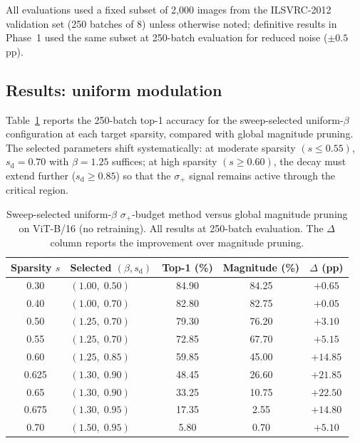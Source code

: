 \documentclass[11pt]{article}
\theoremstyle{plain}
\theoremstyle{definition}
\theoremstyle{remark}
\newcommand{\1}{\mathbf{1}}
\begin{document}
All evaluations used a fixed subset of 2{,}000 images from the ILSVRC-2012 validation set (250 batches of 8) unless otherwise noted; definitive results in Phase~1 used the same subset at 250-batch evaluation for reduced noise (\(\pm 0.5\) pp).

\subsection{Results: uniform modulation}
\label{subsec:uniform_results}

Table~\ref{tab:splus_uniform} reports the 250-batch top-1 accuracy for the sweep-selected uniform-\(\beta\) configuration at each target sparsity, compared with global magnitude pruning.  The selected parameters shift systematically: at moderate sparsity \((s\le 0.55)\), \(s_{\mathrm{d}}=0.70\) with \(\beta=1.25\) suffices; at high sparsity \((s\ge 0.60)\), the decay must extend further (\(s_{\mathrm{d}}\ge 0.85\)) so that the \(\sigma_+\) signal remains active through the critical region.

\begin{table}[ht]
\centering
\caption{Sweep-selected uniform-\(\beta\) \(\sigma_+\)-budget method versus global magnitude pruning on ViT-B/16 (no retraining).  All results at 250-batch evaluation.  The \(\Delta\) column reports the improvement over magnitude pruning.}
\label{tab:splus_uniform}
\begin{tabular}{clccc}
\toprule
Sparsity \(s\) & Selected \((\beta, s_{\mathrm{d}})\) & Top-1 (\%) & Magnitude (\%) & \(\Delta\) (pp) \\
\midrule
0.30 & \((1.00,\;0.50)\) & 84.90 & 84.25 & \(+0.65\) \\
0.40 & \((1.00,\;0.70)\) & 82.80 & 82.75 & \(+0.05\) \\
0.50 & \((1.25,\;0.70)\) & 79.30 & 76.20 & \(+3.10\) \\
0.55 & \((1.25,\;0.70)\) & 72.85 & 67.70 & \(+5.15\) \\
0.60 & \((1.25,\;0.85)\) & 59.85 & 45.00 & \(+14.85\) \\
0.625 & \((1.30,\;0.90)\) & 48.45 & 26.60 & \(+21.85\) \\
0.65 & \((1.30,\;0.90)\) & 33.25 & 10.75 & \(+22.50\) \\
0.675 & \((1.30,\;0.95)\) & 17.35 & 2.55 & \(+14.80\) \\
0.70 & \((1.50,\;0.95)\) & 5.80 & 0.70 & \(+5.10\) \\
\bottomrule
\end{tabular}
\end{table}
\end{document}
